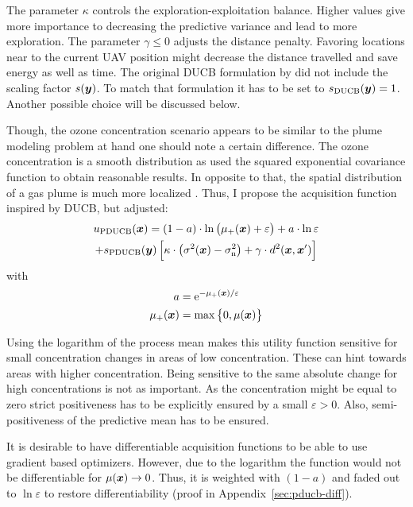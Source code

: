 The parameter $\kappa$ controls the exploration-exploitation balance.  Higher 
values give more importance to decreasing the predictive variance and lead to 
more exploration.  The parameter $\gamma \leq 0$ adjusts the distance penalty.  
Favoring locations near to the current UAV position might decrease the distance 
travelled and save energy as well as time.  The original DUCB formulation by 
\textcite{Marchant:2012wb} did not include the scaling factor $s(\bm{y})$. To 
match that formulation it has to be set to $s_{\mathrm{DUCB}}(\bm{y}) = 1$. Another 
possible choice will be discussed below.

Though, the ozone concentration scenario appears to be similar to the plume 
modeling problem at hand one should note a certain difference. The ozone 
concentration is a smooth distribution as \textcite{Marchant:2012wb} used the 
squared exponential covariance function to obtain reasonable results. In 
opposite to that, the spatial distribution of a gas plume is much more localized 
\parencite[this was also noted by][]{Stachniss:2008vz}. Thus, I propose the 
 acquisition 
function inspired by DUCB, but adjusted:
\begin{multline}
    u\ped{PDUCB}(\vc x) = \del{1 - a} \cdot \ln\del{\mu_+(\vc x) + \varepsilon} 
    + a \cdot \ln \varepsilon \\ + s\ped{PDUCB}(\vc y) \sbr{\kappa \cdot 
        \del[1]{\sigma^2(\vc x) -  \sigma\ped{n}^2} + \gamma \cdot d^2(\vc x, 
        \vc x')}
\end{multline}
with
\begin{align}
    a &= \e^{-\mu_+(\vc x) / \varepsilon} \\
    \mu_+(\vc x) &= \max\cbr{0, \mu(\vc x)}
\end{align}

Using the logarithm of the process mean makes this utility function sensitive 
for small concentration changes in areas of low concentration. These can hint 
towards areas with higher concentration.  Being sensitive to the same absolute 
change for high concentrations is not as important. As the concentration might 
be equal to zero strict positiveness has to be explicitly ensured by a small 
$\varepsilon > 0$.  Also, semi-positiveness of the predictive mean has to be 
ensured.

It is desirable to have differentiable acquisition functions to be able to use 
gradient based optimizers. However, due to the logarithm the function would not 
be differentiable for $\mu(\bm{x}) \rightarrow 0$. Thus, it is weighted with $(1 
- a)$ and faded out to $\ln \varepsilon$ to restore differentiability (proof in 
Appendix~\ref{sec:pducb-diff}).

